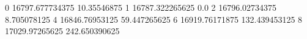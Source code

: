 0 16797.677734375 10.35546875
1 16787.322265625 0.0
2 16796.02734375 8.705078125
4 16846.76953125 59.447265625
6 16919.76171875 132.439453125
8 17029.97265625 242.650390625
